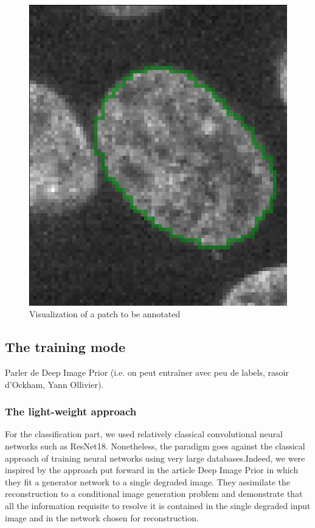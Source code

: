 \documentclass{article}
\begin{document}
\begin{figure}[htp!]
 \centering
 \includegraphics[scale=0.18]{Figures/patch.png}
  \caption{Visualization of a patch to be annotated}
  \label{patch}

\end{figure}



\subsection{The training mode}


Parler de Deep Image Prior (i.e. on peut entraîner avec peu de labels, rasoir d'Ockham, Yann Ollivier).

\subsubsection{The light-weight approach}


For the classification part, we used relatively classical convolutional neural networks such as ResNet18. Nonetheless, the paradigm goes against the classical approach of training neural networks using very large databases.Indeed, we were inspired by the approach put forward in the article Deep Image Prior\cite{lempitsky2018deep} in which they fit a generator network to a single degraded image. They assimilate the reconstruction to a conditional image generation problem and demonstrate that all the information requisite to resolve it is contained in the single degraded input image and in the network chosen for reconstruction.
\end{document}
